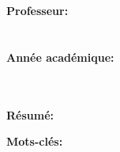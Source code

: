 \begin{center}
\begin{minipage}[t]{.24\textwidth}
\begin{minipage}{.90\textwidth}
\noindent
\scriptsize{\textbf{Professeur:}} \\
\advisor \\
\\
\textbf{Année académique:} \\
\YEAR \\
\\
\end{minipage}
\end{minipage}%
\begin{minipage}{.74\textwidth}
\noindent \textbf{\color{bluePoli} Résumé:} {\abstract}
\end{minipage}
\end{center}

\vspace{15pt}

\begin{tcolorbox}[arc=0pt, boxrule=0pt, colback=bluePoli!60, width=\textwidth, colupper=white]
    \textbf{Mots-clés:} \keywords
\end{tcolorbox}

\vspace{12pt}

